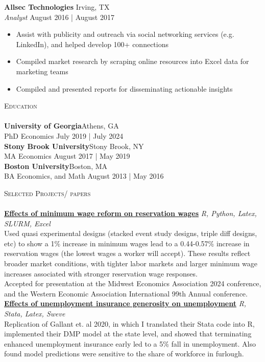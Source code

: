 \documentclass[a4paper]{article}
\newcommand{\lineunder} {
    \vspace*{-8pt} \\
    \hspace*{-18pt} \hrulefill \\
}
\newcommand{\header} [1] {
    {\hspace*{-18pt}\vspace*{6pt} \textsc{#1}}
    \vspace*{-6pt} \lineunder
}
\begin{document}
\textbf{Allsec Technologies} \hfill Irving, TX\\
\textit{Analyst} \hfill August 2016 | August 2017\\
\vspace{-1mm}
\begin{itemize} \itemsep 1pt
	\item Assist with publicity and outreach via social networking services (e.g. LinkedIn), and helped develop 100+ connections
	\item Compiled market research by scraping online resources into Excel data for marketing teams
	\item Compiled and presented reports for disseminating actionable insights
\end{itemize}

\header{Education}
\textbf{University of Georgia}\hfill Athens, GA\\
PhD Economics %
\hfill July 2019 | July 2024\\
\vspace{2mm}
\textbf{Stony Brook University}\hfill Stony Brook, NY\\
MA Economics %
\hfill August 2017 | May 2019\\
\vspace{2mm}
\textbf{Boston University}\hfill Boston, MA\\
BA Economics, and Math %
\hfill August 2013 | May 2016\\
\vspace{2mm}

\header{Selected Projects/ papers}
{\href{https://ptr-64.github.io/files/research\_projects/JMP/JMP\_draft.pdf}{\textbf{Effects of minimum wage reform on reservation wages}}} {\sl R, Python, Latex, SLURM, Excel} \hfill \\
Used quasi experimental designs (stacked event study designs, triple diff designs, etc) to show a 1\% increase in minimum wages lead to a 0.44-0.57\% increase in reservation wages (the lowest wages a worker will accept). These results reflect broader market conditions, with tighter labor markets and larger minimum wage increases associated with stronger reservation wage responses.\\ \vspace*{1mm} Accepted for presentation at the Midwest Economics Association 2024 conference, and the Western Economic Association International 99th Annual conference. \\
\vspace*{2mm}
{\href{https://ptr-64.github.io/files/research\_projects/SYP/fnl\_drft.pdf}{\textbf{Effects of unemployment insurance generosity on unemployment}}} {\sl R, Stata, Latex, Sweve} \hfill \\
Replication of Gallant et. al 2020, in which I translated their Stata code into R, implemented their DMP model at the state level, and showed that terminating enhanced unemployment insurance early led to a 5\% fall in unemployment. Also found model predictions were sensitive to the share of workforce in furlough.\\
\vspace*{2mm}
\end{document}
